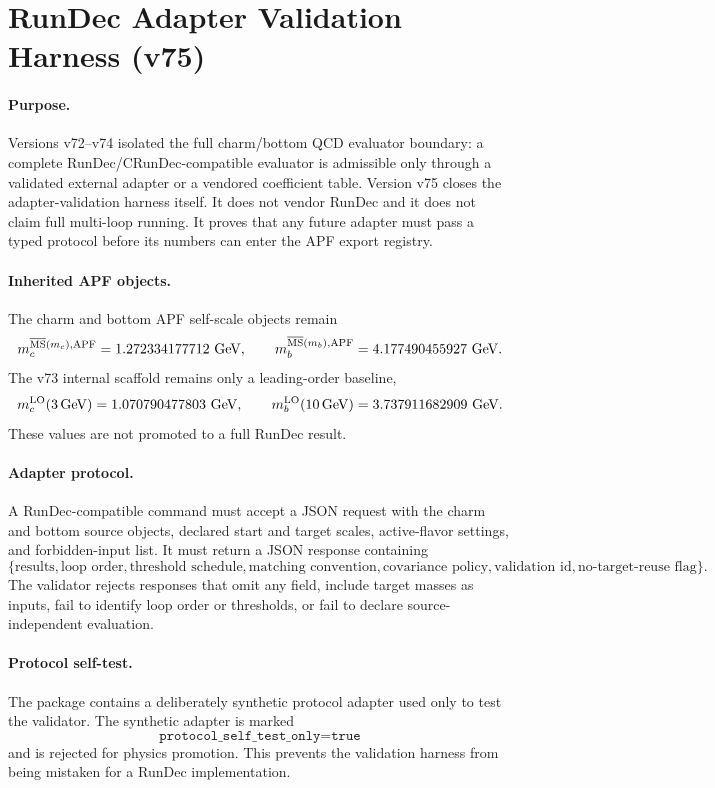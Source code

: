 \section{RunDec Adapter Validation Harness (v75)}
\label{sec:v75-rundec-adapter-validation}

\paragraph{Purpose.}
Versions v72--v74 isolated the full charm/bottom QCD evaluator boundary: a complete RunDec/CRunDec-compatible evaluator is admissible only through a validated external adapter or a vendored coefficient table.  Version v75 closes the adapter-validation harness itself.  It does not vendor RunDec and it does not claim full multi-loop running.  It proves that any future adapter must pass a typed protocol before its numbers can enter the APF export registry.

\paragraph{Inherited APF objects.}
The charm and bottom APF self-scale objects remain
\[
 m_c^{\overline{\rm MS}(m_c),{\rm APF}}=1.272334177712\ {\rm GeV},
 \qquad
 m_b^{\overline{\rm MS}(m_b),{\rm APF}}=4.177490455927\ {\rm GeV}.
\]
The v73 internal scaffold remains only a leading-order baseline,
\[
 m_c^{\rm LO}(3\,{\rm GeV})=1.070790477803\ {\rm GeV},
 \qquad
 m_b^{\rm LO}(10\,{\rm GeV})=3.737911682909\ {\rm GeV}.
\]
These values are not promoted to a full RunDec result.

\paragraph{Adapter protocol.}
A RunDec-compatible command must accept a JSON request with the charm and bottom source objects, declared start and target scales, active-flavor settings, and forbidden-input list.  It must return a JSON response containing
\[
\{\text{results},\text{loop order},\text{threshold schedule},\text{matching convention},\text{covariance policy},\text{validation id},\text{no-target-reuse flag}\}.
\]
The validator rejects responses that omit any field, include target masses as inputs, fail to identify loop order or thresholds, or fail to declare source-independent evaluation.

\paragraph{Protocol self-test.}
The package contains a deliberately synthetic protocol adapter used only to test the validator.  The synthetic adapter is marked
\[
 \boxed{\texttt{protocol\_self\_test\_only=true}}
\]
and is rejected for physics promotion.  This prevents the validation harness from being mistaken for a RunDec implementation.

